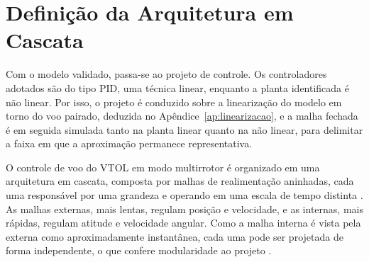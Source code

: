 \section{Definição da Arquitetura em Cascata}

Com o modelo validado, passa-se ao projeto de controle. Os controladores adotados são do tipo PID, uma técnica linear, enquanto a planta identificada é não linear. Por isso, o projeto é conduzido sobre a linearização do modelo em torno do voo pairado, deduzida no Apêndice~\ref{ap:linearizacao}, e a malha fechada é em seguida simulada tanto na planta linear quanto na não linear, para delimitar a faixa em que a aproximação permanece representativa.

O controle de voo do VTOL em modo multirrotor é organizado em uma arquitetura em cascata, composta por malhas de realimentação aninhadas, cada uma responsável por uma grandeza e operando em uma escala de tempo distinta \cite{Hu2024, Beard2012, Idrissi2022, Mohsan2022}. {\color{blue}As malhas externas, mais lentas, regulam posição e velocidade, e as internas, mais rápidas, regulam atitude e velocidade angular. Como a malha interna é vista pela externa como aproximadamente instantânea, cada uma pode ser projetada de forma independente, o que confere modularidade ao projeto \cite{Hu2024}.}

